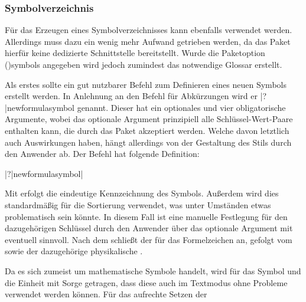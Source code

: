 \documentclass[%
  english,ngerman,%
  cdgeometry=no,DIV=12,%
  cd=false,cdfont=false,cdtitle=true,%
  headings=normal,%
  automark,%
  listof=toc,%
]{tudscrartcl}
\begin{document}
\subsubsection{Symbolverzeichnis}

Für das Erzeugen eines Symbolverzeichnisses kann ebenfalls  
verwendet werden. Allerdings muss dazu ein wenig mehr Aufwand getrieben werden, 
da das Paket hierfür keine dedizierte Schnittstelle bereitstellt. Wurde die 
Paketoption \Option(){symbols} angegeben wird jedoch 
zumindest das notwendige Glossar erstellt.

Als erstes sollte ein gut nutzbarer Befehl zum Definieren eines neuen Symbols 
erstellt werden. In Anlehnung an den Befehl für Abkürzungen  
wird er \Macro|?|{newformulasymbol} genannt. Dieser hat ein optionales und vier 
obligatorische Argumente, wobei das optionale Argument prinzipiell alle 
Schlüssel-Wert-Paare enthalten kann, die durch das Paket  
akzeptiert werden. Welche davon letztlich auch Auswirkungen haben, hängt 
allerdings von der Gestaltung des Stils durch den Anwender ab. Der Befehl hat 
folgende Definition:
%
\begin{quoting}[leftmargin=\parindent]
\Macro|?|{newformulasymbol|%
  \OList{}}
\end{quoting}
%
Mit  erfolgt die eindeutige Kennzeichnung des Symbols. Außerdem 
wird dies standardmäßig für die Sortierung verwendet, was unter Umständen etwas
problematisch sein könnte. In diesem Fall ist eine manuelle Festlegung für den 
dazugehörigen Schlüssel durch den Anwender über das optionale Argument mit 
 eventuell sinnvoll. Nach dem  
schließt der  für das Formelzeichen an, gefolgt vom  
sowie der dazugehörige physikalische .
%
\CodeHook{\let\newcommand\renewcommand}
\begin{Preamble*}
\newcommand*{\newformulasymbol}[5][]{%
  \newglossaryentry{#2}{%
    type=symbols,%
    name={#3},%
    description={\nopostdesc},%
    symbol={\ensuremath{#4}},%
    user1={\ensuremath{\mathrm{#5}}},%
    sort={#2},%
    #1%
  }%
}

\end{Preamble*}
%
Da es sich zumeist um mathematische Symbole handelt, wird für das Symbol und 
die Einheit mit  Sorge getragen, dass diese auch im 
Textmodus ohne Probleme verwendet werden können. Für das aufrechte Setzen der 
\end{document}

